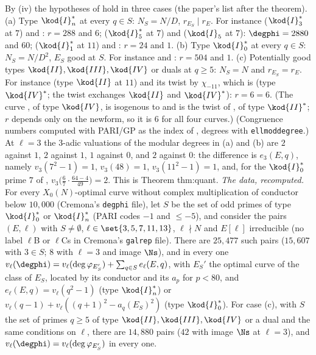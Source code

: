 \begin{example}\label{ex:congruence:twist-cases}
By (iv) the hypotheses of  hold in three cases (the paper's list after the theorem).
(a) Type $\kod{I}_n^*$ at every $q\in S$: $N_S=N/D$, $r_{E_S}\mid r_E$. For instance  ($\kod{I}_3^*$ at $7$) and : $r=288$ and $6$;  ($\kod{I}_5^*$ at $7$) and 
($\kod{I}_5$ at $7$): $\degphi=2880$ and $60$;  ($\kod{I}_1^*$ at $11$) and : $r=24$ and $1$.
(b) Type $\kod{I}_0^*$ at every $q\in S$: $N_S=N/D^2$, $E_S$ good at $S$. For instance  and : $r=504$ and $1$.
(c) Potentially good types $\kod{II},\kod{III},\kod{IV}$ or duals at $q\ge5$: $N_S=N$ and $r_{E_S}=r_E$. For instance  (type $\kod{II}$ at $11$) and its twist by $\chi_{-11}$, which is
 (type $\kod{IV}^*$; the twist exchanges $\kod{II}$ and $\kod{IV}^*$): $r=6=6$. (The curve , of type $\kod{IV}$, is isogenous to  and is the twist of ,
of type $\kod{II}^*$; $r$ depends only on the newform, so it is $6$ for all four curves.)
(Congruence numbers computed with PARI/GP as the index of , degrees with \texttt{ellmoddegree}.)
At $\ell=3$ the $3$-adic valuations of the modular degrees in (a) and (b) are $2$ against $1$, $2$ against $1$, $1$ against $0$, and $2$ against $0$: the difference is $e_3(E,q)$, namely
$v_3(7^2-1)=1$, $v_3(48)=1$, $v_3(11^2-1)=1$, and, for the $\kod{I}_0^*$ prime $7$ of , $v_3\bigl(\frac67\cdot\frac{64-4}{49}\bigr)=2$. This is Theorem thm:quant.
\emph{The data, recomputed.} For every $X_0(N)$-optimal curve without complex multiplication of conductor below $10{,}000$ (Cremona's \texttt{degphi} file), let $S$ be the set of odd primes of type
$\kod{I}_0^*$ or $\kod{I}_n^*$ (PARI codes $-1$ and $\le-5$), and consider the pairs $(E,\ell)$ with $S\ne\emptyset$, $\ell\in\set{3,5,7,11,13}$, $\ell\nmid N$ and $E[\ell]$ irreducible (no label $\ell$B or $\ell$Cs in Cremona's
\texttt{galrep} file). There are $25{,}477$ such pairs ($15{,}607$ with $3\in S$; $8$ with $\ell=3$ and image $\Ns$), and in every one
$v_\ell(\degphi)=v_\ell(\deg\varphi_{E_S'})+\sum_{q\in S}e_\ell(E,q)$, with $E_S'$ the optimal curve of the class of $E_S$, located by its conductor and its $a_p$ for $p<80$, and $e_\ell(E,q)=v_\ell(q^2-1)$
(type $\kod{I}_n^*$) or $v_\ell(q-1)+v_\ell((q+1)^2-a_q(E_S)^2)$ (type $\kod{I}_0^*$). For case (c), with $S$ the set of primes $q\ge5$ of type $\kod{II},\kod{III},\kod{IV}$ or a dual and the same conditions on $\ell$,
there are $14{,}880$ pairs ($42$ with image $\Ns$ at $\ell=3$), and $v_\ell(\degphi)=v_\ell(\deg\varphi_{E_S'})$ in every one.
\end{example}

